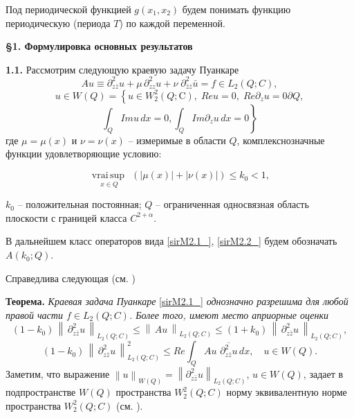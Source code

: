 Под периодической функцией $g(x_{1} ,x_{2} )$ будем понимать функцию периодическую (периода $T$) по каждой переменной.

\textbf{\S 1. Формулировка основных результатов}

\textbf{1.1.} Рассмотрим следующую краевую задачу Пуанкаре
\begin{equation*}
Au \equiv \partial _{z\bar{z}}^{2} u+\mu \, \partial _{zz}^{2} u+\nu \; \partial _{\bar{z}\bar{z}}^{2} \bar{u}=f\in L_{2} (Q;C),
\end{equation*}
\begin{equation*}
u\in W(Q)=\left\{u\in W_{2}^{2} (Q;\mathrm{C}),\; Reu=0,\; Re\partial _{z} u=0  \partial Q, \right.
\end{equation*}
\begin{equation}
\label{sirM2.1_}
\left. \int _{Q}Imu\, dx=0 ,\int _{Q}Im\partial _{z} u\, dx=0 \right\}
\end{equation}
 где  $\mu =\mu (x)$ и  $\nu =\nu (x)$ --  измеримые в области  $Q$,  комплекснозначные функции удовлетворяющие условию:

\begin{equation}
\label{sirM2.2_} \mathop{\mathrm{ vrai}\, \sup }\limits_{\, \, x\in Q} \; \, \left(|\mu (x)|+|\nu (x)|\right)\le k_{0} <1,     \end{equation}


$k_{0} $ -- положительная постоянная; $Q$ -- ограниченная односвязная область плоскости с границей класса $C^{2+\alpha } $.

В дальнейшем класс операторов вида \eqref{sirM2.1_}, \eqref{sirM2.2_} будем обозначать $A(k_{0} ;Q)$.

Справедлива следующая (см. \cite{Jamaludinova})

\textbf{Теорема. }\textit{Краевая задача Пуанкаре }\eqref{sirM2.1_} \textit{однозначно разрешима для любой правой части $f\in L_{2} (Q;C)$. Более того, имеют место априорные оценки}
\begin{equation}
(1-k_{0} )\, \left\| \, \partial _{z\bar{z}}^{2} u\, \right\| _{L_{2} (Q;C)} \le \left\| \, Au\, \right\| _{L_{2} (Q;C)} \le (1+k_{0} )\, \left\| \, \partial _{z\bar{z}}^{2} u\, \right\| _{L_{2} (Q;C)},
\label{sirM2.3_}
\end{equation}
\begin{equation}
(1-k_{0} )\, \left\| \, \partial _{z\bar{z}}^{2} u\, \right\| ^{2} _{L_{2} (Q;C)} \le Re\int _{Q}Au\, \, \overline{\partial _{z\bar{z}}^{2} u} \, dx,\quad u\in W(Q).
\label{sirM2.4_}
\end{equation}
Заметим, что выражение $\left\| u\right\| _{W(Q)} =\left\| \partial _{z\bar{z}}^{2} u\right\| _{L_{2} (Q;C)} $, $u\in W(Q)$, задает в подпространстве $W(Q)$ пространства $W_{2}^{2} (Q;C)$ норму эквивалентную норме пространства $W_{2}^{2} (Q;C)$ (см. \cite{Jamaludinova}).


